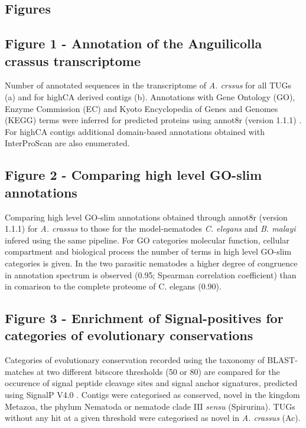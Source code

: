 \documentclass[10pt]{bmc_article}
\newenvironment{bmcformat}{\begin{raggedright}\baselineskip20pt\sloppy\setboolean{publ}{false}}{\end{raggedright}\baselineskip20pt\sloppy}
\begin{document}
\begin{bmcformat}

\section*{Figures}

\subsection*{Figure 1 - Annotation of the Anguilicolla crassus transcriptome}
 

Number of annotated sequences in the transcriptome of
\textit{A. crssus} for all TUGs (a) and for highCA derived contigs
(b). Annotations with Gene Ontology (GO), Enzyme Commission (EC) and
Kyoto Encyclopedia of Genes and Genomes (KEGG) terms were inferred for
predicted proteins using annot8r (version 1.1.1)
\cite{schmid_annot8r:_2008}. For highCA contigs additional
domain-based annotations obtained with InterProScan
\cite{pmid11590104} are also enumerated.

\subsection*{Figure 2 - Comparing high level GO-slim annotations}

Comparing high level GO-slim annotations obtained through annot8r
(version 1.1.1) \cite{schmid_annot8r:_2008} for \textit{A. crassus} to
those for the model-nematodes \textit{C. elegans} and
\textit{B. malayi} infered using the same pipeline. For GO categories
molecular function, cellular compartment and biological process the
number of terms in high level GO-slim categories is given. In the two
parasitic nematodes a higher degree of congruence in annotation
spectrum is observed (0.95; Spearman correlation coefficient) than in
comarison to the complete proteome of C. elegans (0.90).

\subsection*{Figure 3 - Enrichment of Signal-positives for categories
  of evolutionary conservations}

Categories of evolutionary conservation recorded using the taxonomy of
BLAST-matches at two different bitscore thresholds (50 or 80) are
compared for the occurence of signal peptide cleavage sites and signal
anchor signatures, predicted using SignalP V4.0 \cite{pmid21959131}.
Contigs were categorised as conserved, novel in the kingdom Metazoa,
the phylum Nematoda or nematode clade III \textit{sensu}
\cite{blaxter_molecular_1998} (Spirurina). TUGs without any hit at a
given threshold were categorised as novel in \textit{A. crassus} (Ac).


\end{bmcformat}
\end{document}
